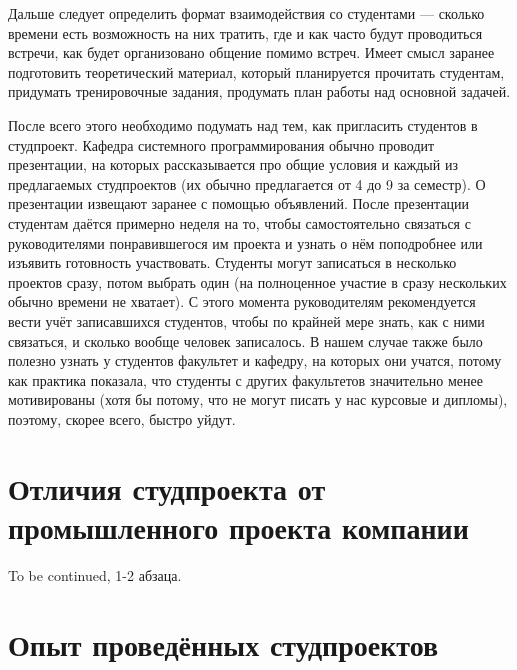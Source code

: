 \documentclass[a5paper]{article}
\begin{document}
Дальше следует определить формат взаимодействия со студентами --- сколько времени есть возможность на них тратить, где и как часто будут проводиться встречи, как будет организовано общение помимо встреч. Имеет смысл заранее подготовить теоретический материал, который планируется прочитать студентам, придумать тренировочные задания, продумать план работы над основной задачей.

После всего этого необходимо подумать над тем, как пригласить студентов в студпроект. Кафедра системного программирования обычно проводит презентации, на которых рассказывается про общие условия и каждый из предлагаемых студпроектов (их обычно предлагается от 4 до 9 за семестр). О презентации извещают заранее с помощью объявлений. После презентации студентам даётся примерно неделя на то, чтобы самостоятельно связаться с руководителями понравившегося им проекта и узнать о нём поподробнее или изъявить готовность участвовать. Студенты могут записаться в несколько проектов сразу, потом выбрать один (на полноценное участие в сразу нескольких обычно времени не хватает). С этого момента руководителям рекомендуется вести учёт записавшихся студентов, чтобы по крайней мере знать, как с ними связаться, и сколько вообще человек записалось. В нашем случае также было полезно узнать у студентов факультет и кафедру, на которых они учатся, потому как практика показала, что студенты с других факультетов значительно менее мотивированы (хотя бы потому, что не могут писать у нас курсовые и дипломы), поэтому, скорее всего, быстро уйдут.

\section{Отличия студпроекта от промышленного проекта компании}
To be continued, 1-2 абзаца.

\section{Опыт проведённых студпроектов}
\end{document}
